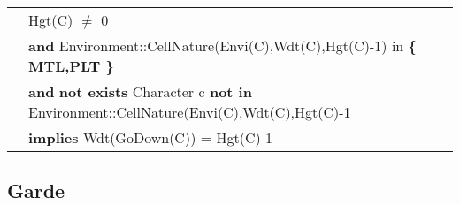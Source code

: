 \documentclass{article}
\begin{document}
\begin{tabular}{rl}
& \textrm{Hgt(C)} $\neq$ 0 \\
& \quad \textbf{and} \textrm{Environment::CellNature(Envi(C),Wdt(C),Hgt(C)-1)} \textrm{in} \textbf{ \{ MTL,PLT \} } \\
& \quad \textbf{and} \textbf{not exists} \textrm{Character} c \textbf{ not in} \textrm{Environment::CellNature(Envi(C),Wdt(C),Hgt(C)-1} \\
& \quad \textbf{implies} \textrm{Wdt(GoDown(C))} = \textrm{Hgt(C)}-1 \\

\end{tabular}



\subsection*{Garde}
\end{document}
